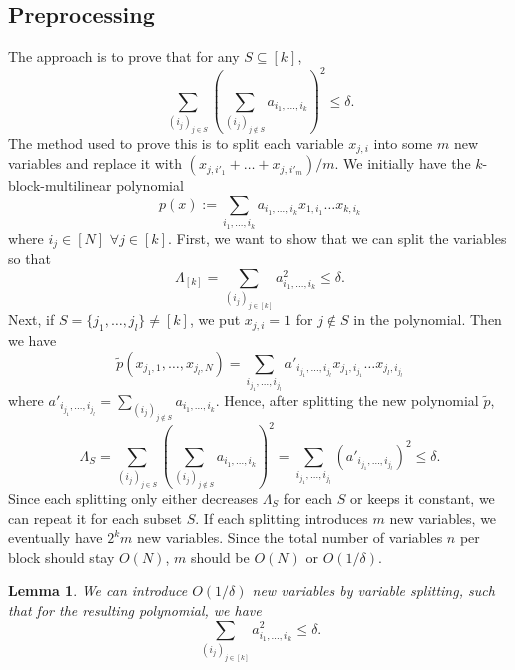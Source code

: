 \documentclass[12pt]{report}
\newtheorem{lemma}{Lemma}
\begin{document}
\subsection{Preprocessing}
The approach is to prove that for any $S \subseteq [k]$,
$$
\sum_{(i_j)_{j \in S}} \left(\sum_{(i_j)_{j \notin S}} a_{i_1, \ldots, i_k}\right)^2 \leq \delta.
$$
The method used to prove this is to split each variable $x_{j,i}$ into some $m$ new variables and replace it with $(x_{j,i'_1} + \ldots + x_{j,i'_m})/m$. We initially have the $k$-block-multilinear polynomial
\begin{equation}
p(x) := \sum_{i_1, \ldots, i_k} a_{i_1, \ldots, i_k} x_{1,i_1} \ldots x_{k,i_k}
\end{equation}
where $i_j \in [N]$ $\forall j \in [k]$. First, we want to show that we can split the variables so that
$$
\Lambda_{[k]} = \sum_{(i_j)_{j \in [k]}} a_{i_1, \ldots, i_k}^2 \leq \delta.
$$
Next, if $S = \{j_1, \ldots, j_l\} \neq [k]$, we put $x_{j,i} = 1$ for $j \notin S$ in the polynomial. Then we have
$$
\tilde{p}(x_{j_1,1}, \ldots, x_{j_l,N}) = \sum_{i_{j_1}, \ldots, i_{j_l}} a'_{i_{j_1}, \ldots, i_{j_l}} x_{j_1,i_{j_1}} \ldots x_{j_l,i_{j_l}}
$$
where $a'_{i_{j_1}, \ldots, i_{j_l}} = \sum_{(i_j)_{j \notin S}} a_{i_1, \ldots, i_k}$. Hence, after splitting the new polynomial $\tilde{p}$,
$$
\Lambda_S = \sum_{(i_j)_{j \in S}} \left(\sum_{(i_j)_{j \notin S}} a_{i_1, \ldots, i_k}\right)^2 = \sum_{i_{j_1}, \ldots, i_{j_l}} (a'_{i_{j_1}, \ldots, i_{j_l}})^2 \leq \delta.
$$
Since each splitting only either decreases $\Lambda_S$ for each $S$ or keeps it constant, we can repeat it for each subset $S$. If each splitting introduces $m$ new variables, we eventually have $2^k m$ new variables. Since the total number of variables $n$ per block should stay $O(N)$, $m$ should be $O(N)$ or $O(1/\delta)$.

\begin{lemma}
We can introduce $O(1/\delta)$ new variables by variable splitting, such that for the resulting polynomial, we have
$$
\sum_{(i_j)_{j \in [k]}} a_{i_1, \ldots, i_k}^2 \leq \delta.
$$
\end{lemma}
\end{document}
